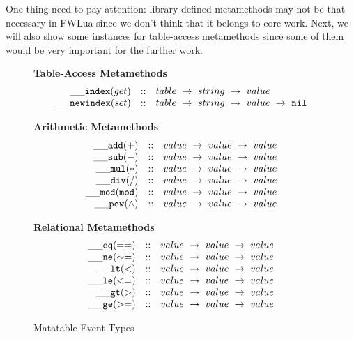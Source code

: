 One thing need to pay attention: library-defined metamethods may not be that necessary in FWLua since we don't think that it belongs to core work. Next, we will also show some instances for table-access metamethods since some of them would be very important for the further work.

\begin{figure}[P]
\caption{Matatable Event Types}
{\bf Table-Access Metamethods}
\label{fig:matatables}
\[
\begin{array}{rclcl}
  {\tt \_\_index}(get) & :: & {table} ~\rightarrow ~ {string} ~\rightarrow ~ {value} \\
  {\tt \_\_newindex}(set)   & :: &  {table} ~\rightarrow ~{string} ~\rightarrow ~{value} ~\rightarrow ~{\tt nil}\\
\end{array}
\]

{\bf Arithmetic Metamethods}
\[
\begin{array}{rclcl}
  {\tt \_\_add(+)}   & :: &  {value} ~\rightarrow ~{value}~\rightarrow ~{value}\\
  {\tt \_\_sub(-)}   & :: &  {value} ~\rightarrow ~{value}~\rightarrow ~{value}\\
  {\tt \_\_mul(*)}   & :: &  {value} ~\rightarrow ~{value}~\rightarrow ~{value}\\
  {\tt \_\_div(/)}   & :: &  {value} ~\rightarrow ~{value}~\rightarrow ~{value}\\
  {\tt \_\_mod(mod)}   & :: &  {value} ~\rightarrow ~{value}~\rightarrow ~{value}\\
  {\tt \_\_pow({\wedge})}   & :: &  {value} ~\rightarrow ~{value}~\rightarrow ~{value}\\
\end{array}
\]

{\bf Relational Metamethods}
\[
\begin{array}{rclcl}
  {\tt \_\_eq(==)} & :: & {value} ~\rightarrow ~ {value} ~\rightarrow ~ {value}\\
  {\tt \_\_ne(\sim=)} & :: & {value} ~\rightarrow ~ {value} ~\rightarrow ~ {value}\\
  {\tt \_\_lt(<)}   & :: &  {value} ~\rightarrow ~{value} ~\rightarrow ~{value}\\
  {\tt \_\_le(<=)}   & :: &  {value} ~\rightarrow ~{value} ~\rightarrow ~{value}\\
  {\tt \_\_gt(>)}   & :: &  {value} ~\rightarrow ~{value} ~\rightarrow ~{value}\\
  {\tt \_\_ge(>=)}   & :: &  {value} ~\rightarrow ~{value} ~\rightarrow ~{value}\\
\end{array}
\]
\end{figure}

